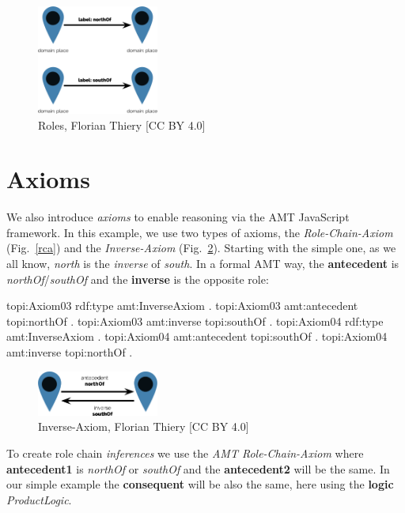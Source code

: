 \documentclass[twocolumn]{autart}
\begin{document}
\begin{figure}[!htb]
\begin{center}
\includegraphics[width=4cm]{roles.png}
\caption{Roles, Florian Thiery [CC BY 4.0]}
\label{roles}
\end{center}
\end{figure}

\section{Axioms}

We also introduce \textit{axioms} to enable reasoning via the AMT JavaScript framework. In this example, we use two types of axioms, the \textit{Role-Chain-Axiom} (Fig.~\ref{rca}) and the \textit{Inverse-Axiom} (Fig.~\ref{ia}). Starting with the simple one, as we all know, \textit{north} is the \textit{inverse} of \textit{south}. In a formal AMT way, the \textbf{antecedent} is \textit{northOf}/\textit{southOf} and the \textbf{inverse} is the opposite role:
 
\begin{verbnobox}
topi:Axiom03 rdf:type amt:InverseAxiom .
topi:Axiom03 amt:antecedent topi:northOf .
topi:Axiom03 amt:inverse topi:southOf .
topi:Axiom04 rdf:type amt:InverseAxiom .
topi:Axiom04 amt:antecedent topi:southOf .
topi:Axiom04 amt:inverse topi:northOf .
\end{verbnobox}

\begin{figure}[!htb]
\begin{center}
\includegraphics[width=4cm]{axiom_inverse.png}
\caption{Inverse-Axiom, Florian Thiery [CC BY 4.0]}
\label{ia}
\end{center}
\end{figure}

To create role chain \textit{inferences} we use the \textit{AMT Role-Chain-Axiom} where \textbf{antecedent1} is \textit{northOf} or \textit{southOf} and the \textbf{antecedent2} will be the same. In our simple example the \textbf{consequent} will be also the same, here using the \textbf{logic} \textit{ProductLogic}.
\end{document}
